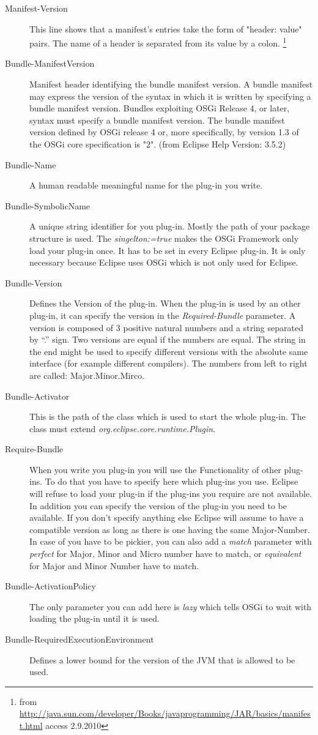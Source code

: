 \documentclass[a4paper,10pt]{report}
\begin{document}
\begin{description}
 \item[Manifest-Version] This line shows that a manifest's entries take the form of "header: value" pairs. The name of a header is separated from its value by a colon. \footnote{from \href{ http://java.sun.com/developer/Books/javaprogramming/JAR/basics/manifest.html}{ http://java.sun.com/developer/Books/javaprogramming/JAR/basics/manifest.html} access 2.9.2010}
 \item[Bundle-ManifestVersion] Manifest header identifying the bundle manifest version. A bundle manifest may express the version of the syntax in which it is written by specifying a bundle manifest version. Bundles exploiting OSGi Release 4, or later, syntax must specify a bundle manifest version. 
The bundle manifest version defined by OSGi release 4 or, more specifically, by version 1.3 of the OSGi core specification is "2". (from Eclipse Help Version: 3.5.2)
 \item[Bundle-Name] A human readable meaningful name for the plug-in you write.
 \item[Bundle-SymbolicName] A unique string identifier for you plug-in. Mostly the path of your package structure is used. The {\it singelton:=true} makes the OSGi Framework only load your plug-in once. It has to be set in every Eclipse plug-in. It is only necessary because Eclipse uses OSGi which is not only used for Eclipse.
 \item[Bundle-Version] Defines the Version of the plug-in. When the plug-in is used by an other plug-in, it can specify the version in the {\it Required-Bundle} parameter. A version is composed of 3 positive natural numbers and a string separated by ``.'' sign. Two versions are equal if the numbers are equal. The string in the end might be used to specify different versions with the absolute same interface (for example different compilers). The numbers from left to right are called: Major.Minor.Mirco.
 \item[Bundle-Activator] This is the path of the class which is used to start the whole plug-in. The class must extend {\it org.eclipse.core.runtime.Plugin}. 
 \item[Require-Bundle] When you write you plug-in you will use the Functionality of other plug-ins. To do that you have to specify here which plug-ins you use. Eclipse will refuse to load your plug-in if the plug-ins you require are not available. In addition you can specify the version of the plug-in you need to be available. If you don't specify anything else Eclipse will assume to have a compatible version as long as there is one having the same Major-Number. In case of you have to be pickier, you can also add a {\it match} parameter with {\it perfect} for Major, Minor and Micro number have to match, or {\it equivalent} for Major and Minor Number have to match.
 \item[Bundle-ActivationPolicy] The only parameter you can add here is {\it lazy} which tells OSGi to wait with loading the plug-in until it is used.
 \item[Bundle-RequiredExecutionEnvironment] Defines a lower bound for the version of the JVM that is allowed to be used.
 \end{description}
\end{document}

